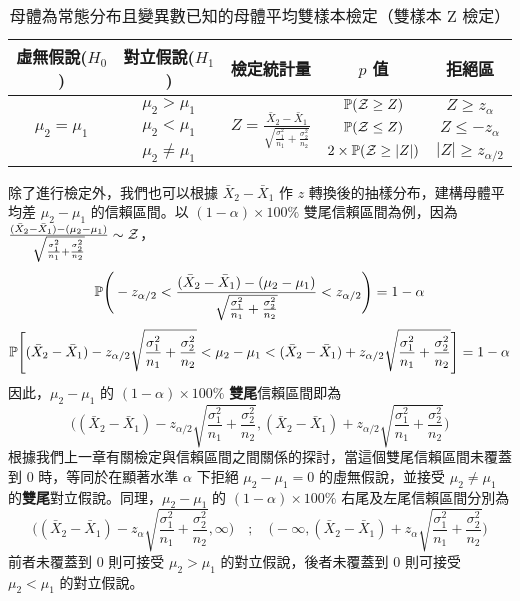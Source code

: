     \begin{table}[htbp]
        \begin{center}
            \begin{tabular}{ccccc}
                \toprule
                虛無假說($H_0$) & 對立假說($H_1$) & 檢定統計量 & $p$ 值 & 拒絕區\\
                \hline
                \multirow{3}{*}{$\mu_2 = \mu_1$} & $\mu_2 > \mu_1$ & \multirow{3}{*}{$Z = \frac{\bar{X}_2-\bar{X}_1}{\sqrt{\frac{\sigma_1^2}{n_1}+\frac{\sigma_2^2}{n_2}}}$} & $\mathbb{P}(\mathcal{Z} \ge Z)$ & $Z \ge z_{\alpha}$\\
                & $\mu_2 < \mu_1$ & &$\mathbb{P}(\mathcal{Z} \le Z)$&$Z \le -z_{\alpha}$\\
                & $\mu_2 \ne \mu_1$ & &$2\times\mathbb{P}(\mathcal{Z} \ge |Z|)$&$|Z| \ge z_{\alpha/2}$\\
                \bottomrule
            \end{tabular}
            \caption{母體為常態分布且變異數已知的母體平均雙樣本檢定（雙樣本 Z 檢定）\label{tab:two_sample_z}}
        \end{center}
    \end{table}

    除了進行檢定外，我們也可以根據 $\bar{X}_2 - \bar{X}_1$ 作 $z$ 轉換後的抽樣分布，建構母體平均差 $\mu_2 - \mu_1$ 的信賴區間。以 $(1-\alpha) \times 100\%$ 雙尾信賴區間為例，因為 $\frac{(\bar{X}_2-\bar{X}_1)-(\mu_2-\mu_1)}{\sqrt{\frac{\sigma_1^2}{n_1} + \frac{\sigma_2^2}{n_2}}} \sim \mathcal{Z}$，
    \[\mathbb{P}\Bigg(-z_{\alpha/2} < \frac{(\bar{X}_2-\bar{X}_1)-(\mu_2-\mu_1)}{\sqrt{\frac{\sigma_1^2}{n_1} + \frac{\sigma_2^2}{n_2}}} < z_{\alpha/2}\Bigg) = 1-\alpha\]
    \[\mathbb{P}\Bigg[(\bar{X}_2-\bar{X}_1) - z_{\alpha/2} \sqrt{\frac{\sigma_1^2}{n_1} + \frac{\sigma_2^2}{n_2}} < \mu_2-\mu_1  < (\bar{X}_2-\bar{X}_1) + z_{\alpha/2} \sqrt{\frac{\sigma_1^2}{n_1} + \frac{\sigma_2^2}{n_2}}\Bigg] = 1-\alpha\]
    因此，$\mu_2-\mu_1$ 的 $(1-\alpha) \times 100\%$ \textbf{雙尾}信賴區間即為
    \[\Bigg((\bar{X}_2-\bar{X}_1) - z_{\alpha/2} \sqrt{\frac{\sigma_1^2}{n_1} + \frac{\sigma_2^2}{n_2}},  (\bar{X}_2-\bar{X}_1) + z_{\alpha/2} \sqrt{\frac{\sigma_1^2}{n_1} + \frac{\sigma_2^2}{n_2}}\Bigg)\]
    根據我們上一章有關檢定與信賴區間之間關係的探討，當這個雙尾信賴區間未覆蓋到 $0$ 時，等同於在顯著水準 $\alpha$ 下拒絕 $\mu_2 - \mu_1 = 0$ 的虛無假說，並接受 $\mu_2 \ne \mu_1$ 的\textbf{雙尾}對立假說。同理，$\mu_2-\mu_1$ 的 $(1-\alpha) \times 100\%$ 右尾及左尾信賴區間分別為
    \[\Bigg((\bar{X}_2-\bar{X}_1) - z_{\alpha} \sqrt{\frac{\sigma_1^2}{n_1} + \frac{\sigma_2^2}{n_2}}, \infty \Bigg) \quad ; \quad \Bigg(-\infty, (\bar{X}_2-\bar{X}_1) + z_{\alpha} \sqrt{\frac{\sigma_1^2}{n_1} + \frac{\sigma_2^2}{n_2}} \Bigg)\]
    前者未覆蓋到 $0$ 則可接受 $\mu_2 > \mu_1$ 的對立假說，後者未覆蓋到 $0$ 則可接受 $\mu_2 < \mu_1$ 的對立假說。
    
